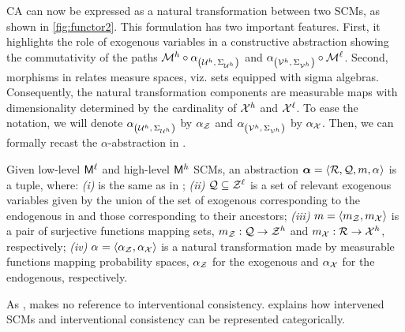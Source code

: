 CA can now be expressed as a natural transformation between two SCMs, as shown in \cref{fig:functor2}. This formulation has two important features.
First, it highlights the role of exogenous variables in a constructive abstraction showing the commutativity of the paths $\mathcal{M}^h \circ \alpha_{\left(\mathcal{U}^{h},\, \Sigma_{\mathcal{U}^h}\right)}$ and $\alpha_{\left(\mathcal{V}^{h},\, \Sigma_{\mathcal{V}^h}\right)} \circ \mathcal{M}^\ell$. Second, morphisms in \Prob relates measure spaces, viz. sets equipped with sigma algebras. Consequently, the natural transformation components are measurable maps with dimensionality determined by the cardinality of $\mathcal{X}^h$ and $\mathcal{X}^\ell$.
To ease the notation, we will denote $\alpha_{\left(\mathcal{U}^{h},\, \Sigma_{\mathcal{U}^h}\right)}$ by $\alpha_{\mathcal{Z}}$ and $\alpha_{\left(\mathcal{V}^{h},\, \Sigma_{\mathcal{V}^h}\right)} $ by $\alpha_{\mathcal{X}}$.
Then, we can formally recast the $\alpha$-abstraction in \Prob.
\begin{definition}\label{def:alpha_abstraction_prob}
    Given low-level $\mathsf{M}^\ell$ and high-level $\mathsf{M}^h$ SCMs, %
    an abstraction $\boldsymbol{\alpha} = \langle \mathcal{R}, \mathcal{Q}, m, \alpha_{} \rangle$ is a tuple, where: \emph{(i)} \Rset is the same as in ; \emph{(ii)} $\mathcal{Q} \subseteq \mathcal{Z}^\ell$ is a set of relevant exogenous variables given by the union of the set of exogenous corresponding to the endogenous in \Rset and those corresponding to their ancestors; \emph{(iii)} $m=\langle m_\mathcal{Z}, m_\mathcal{X} \rangle$ is a pair of surjective functions mapping sets, $m_\mathcal{Z}: \mathcal{Q} \rightarrow \mathcal{Z}^h$ and $m_\mathcal{X}: \mathcal{R} \rightarrow \mathcal{X}^h$, respectively; \emph{(iv)} $\alpha_{}=\langle \alpha_{\mathcal{Z}}, \alpha_{\mathcal{X}} \rangle$ is a natural transformation made by measurable functions mapping probability spaces, $\alpha_{\mathcal{Z}}$ for the exogenous and $\alpha_{\mathcal{X}}$ for the endogenous, respectively.  
\end{definition}
As ,  makes no reference to interventional consistency.
 explains how intervened SCMs and interventional consistency can be represented categorically.